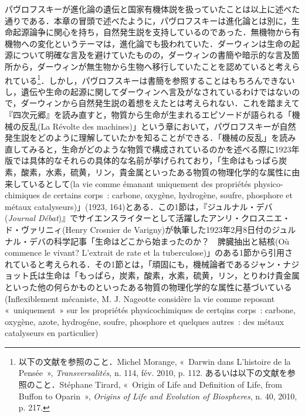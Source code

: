 パヴロフスキーが進化論の遺伝と国家有機体説を扱っていたことは以上に述べた通りである．本章の冒頭で述べたように，パヴロフスキーは進化論とは別に，生命起源論争に関心を持ち，自然発生説を支持しているのであった．無機物から有機物への変化というテーマは，進化論でも扱われていた．ダーウィンは生命の起源について明確な言及を避けていたものの，ダーウィンの書簡や暗示的な言及箇所から，ダーウィンが無生物から生物へ移行していたことを認めていると考えられている\footnote{以下の文献を参照のこと．Michel Morange, «~Darwin dans L'histoire de la Pensée~», \emph{Transversalités}, n. 114, fév. 2010, p. 112. あるいは以下の文献を参照のこと．Stéphane Tirard, «~Origin of Life and Definition of Life, from Buffon to Oparin~», \emph{Origins of Life and Evolution of Biospheres}, n. 40, 2010, p. 217.}．しかし，パヴロフスキーは書簡を参照することはもちろんできないし，遺伝や生命の起源に関してダーウィンへ言及がなされているわけではないので，ダーウィンから自然発生説の着想をえたとは考えられない．これを踏まえて『四次元郷』を読み直すと，物質から生命が生まれるエピソードが語られる「機械の反乱(La Révolte des machines)」という章において，パヴロフスキーが自然発生説をどのように理解していたかを知ることができる．「機械の反乱」を読み直してみると，生命がどのような物質で構成されているのかを述べる際に1923年版では具体的なそれらの具体的な名前が挙げられており，「生命はもっぱら炭素，酸素，水素，硫黄，リン，貴金属といったある物質の物理化学的な属性に由来しているとして(la vie comme émanant uniquement des propriétés physico-chimiques de certains corps~: carbone, oxygène, hydrogène, soufre, phosphore et métaux catalyseurs)」(1923, 164)とある．この1節は，『ジュルナル・デバ(\emph{Journal Débat})』でサイエンスライターとして活躍したアンリ・クロスニエ・ド・ヴァリニィ(Henry Crosnier de Varigny)が執筆した1923年2月8日付のジュルナル・デバの科学記事「生命はどこから始まったのか？　脾臓抽出と結核(Où commence le vivant? L'extrait de rate et la tuberculose)」のある1節から引用されていると考えられる．その1節とは，「頑固にも，機械論者であるジャン・ナジョット氏は生命は「もっぱら，炭素，酸素，水素，硫黄，リン，とりわけ貴金属といった他の何らかものといったある物質の物理化学的な属性に基づいている(Inflexiblement mécaniste, M. J. Nageotte considère la vie comme reposant «~uniquement~» sur les propriétés physicochimiques de certqins corps~: carbone, oxygène, azote, hydrogéne, soufre, phosphore et quelques autres~: des métaux catalyseurs en particulier)
